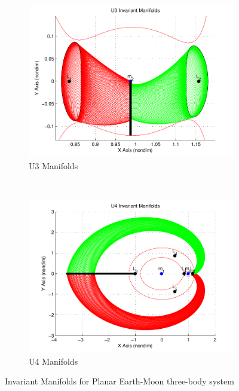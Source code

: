 \begin{figure}
\begin{subfigure}[b]{0.25\textwidth}
                \label{fig:u2_manifolds}
        \end{subfigure}~
        \begin{subfigure}[b]{0.25\textwidth}
                \includegraphics[width=\columnwidth]{figures/2015_AAS/U3_Manifolds}
                \caption{U3 Manifolds}
                \label{fig:u3_manifolds}
        \end{subfigure}%
        ~%
        \begin{subfigure}[b]{0.25\textwidth}
                \includegraphics[width=\columnwidth]{figures/2015_AAS/U4_Manifolds}
                \caption{U4 Manifolds}
                \label{fig:u4_manifolds}
        \end{subfigure}
        \caption{Invariant Manifolds for Planar Earth-Moon three-body system}
	\label{fig:invariant_manifolds}
\end{figure}
